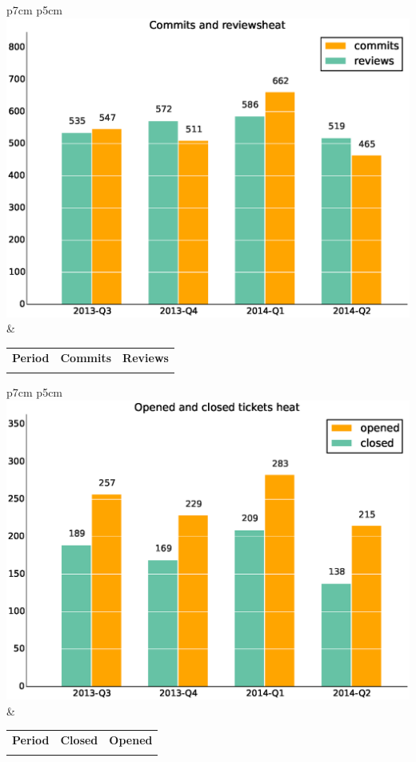 \documentclass[a4wide,11pt]{report}
\begin{document}
\begin{tabular}{p{7cm} p{5cm}}
    \vspace{0pt} 
    \includegraphics[scale=.35]{figs/commitsheat.eps}
    & 
    \vspace{0pt}
    \begin{tabular}{l|r|r|}%
    \bfseries Period & \bfseries Commits & \bfseries Reviews %
    \csvreader[head to column names]{data/commitsheat.csv}{}%
    {\\ & \commits & \submitted}
    \end{tabular}
\end{tabular}

\begin{tabular}{p{7cm} p{5cm}}
    \vspace{0pt} 
    \includegraphics[scale=.35]{figs/closedheat.eps}
    & 
    \vspace{0pt}
    \begin{tabular}{l|r|r|}%
\bfseries Period & \bfseries Closed & \bfseries Opened
    \csvreader[head to column names]{data/closedheat.csv}{}%
    {\\ & \closed & \opened}
    \end{tabular}
\end{tabular}
\end{document}
